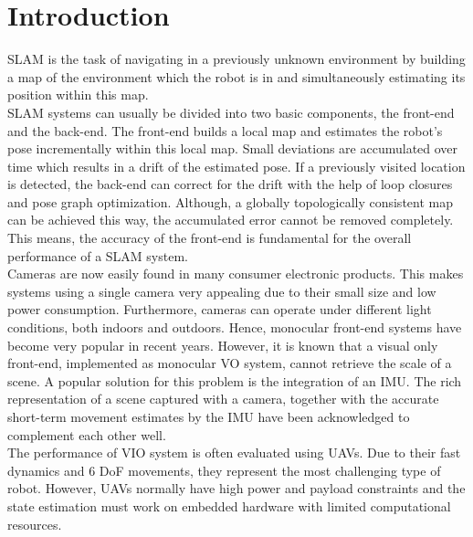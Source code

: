 \chapter{Introduction}
\label{sec:introduction}





\acf{SLAM} is the task of navigating in a previously unknown environment by 
building a map of the environment which the robot is in and simultaneously 
estimating its position within this map. \\

\ac{SLAM} systems can usually be divided into two basic components, the 
front-end and the back-end. The front-end builds a local map and estimates the 
robot's pose incrementally within this local map. Small deviations are 
accumulated over time which results in a drift of the estimated pose. If a 
previously visited location is detected, the back-end can 
correct for the drift with the help of loop closures and pose graph 
optimization. 
Although, a globally topologically consistent map can be achieved this way, the 
accumulated 
error cannot be removed completely. This means, the accuracy of the front-end 
is fundamental for the overall performance of a \ac{SLAM} system. \\

Cameras are now easily found in many consumer electronic products. This makes 
systems using a single camera very appealing due to their small size and low 
power consumption. Furthermore, cameras can operate under different light 
conditions, both indoors and outdoors. Hence, monocular front-end systems 
have become very popular in recent years. However, it is known that a visual 
only front-end, implemented as monocular \ac{VO} system, cannot retrieve the 
scale of a scene. A popular solution for this problem is the integration of an 
\ac{IMU}. The rich representation of a scene captured with a camera, together 
with the accurate short-term movement estimates by the \ac{IMU} have been 
acknowledged to complement each other well.\\ 

The performance of \ac{VIO} system is often evaluated using \acp{UAV}. Due to 
their fast dynamics and 6 \ac{DoF} movements, they represent the most 
challenging type of robot. However, \acp{UAV} normally have high power and 
payload constraints and the state estimation must work on embedded hardware 
with limited computational resources. \\ 

